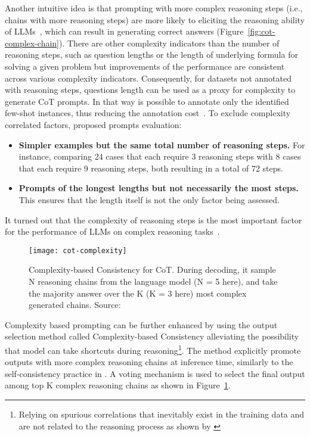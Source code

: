 Another intuitive idea is that prompting with more complex reasoning steps (i.e., chains with more reasoning steps) are more likely to eliciting the reasoning ability of LLMs~\cite{fu2022complexity}, which can result in generating correct answers (Figure~\ref{fig:cot-complex-chain}).
There are other complexity indicators than the number of reasoning steps, such as question lengths or the length of underlying formula for solving a given problem but improvements of the performance are consistent across various complexity indicators.
Consequently, for datasets not annotated with reasoning steps, questions length can be used as a proxy for complexity to generate CoT prompts.
In that way is possible to annotate only the identified few-shot instances, thus reducing the annotation cost~\cite{fu2022complexity}.
To exclude complexity correlated factors, \textcite{fu2022complexity} proposed prompts evaluation:
\begin{itemize}
	\item \textbf{Simpler examples but the same total number of reasoning steps.} {For instance, comparing 24 cases that each require 3 reasoning steps with 8 cases that each require 9 reasoning steps, both resulting in a total of 72 steps.}
	\item \textbf{Prompts of the longest lengths but not necessarily the most steps.} {This ensures that the length itself is not the only factor being assessed.}
\end{itemize}
It turned out that the complexity of reasoning steps is the most important factor for the performance of LLMs on complex reasoning tasks~\cite{fu2022complexity}.
\begin{figure}[h!]
	\centering
	\texttt{[image: cot-complexity]}
	\caption{Complexity-based Consistency for CoT. During decoding, it sample N reasoning chains from the language model (N = 5 here), and take the majority answer over the K (K = 3 here) most complex generated chains. Source: \textcite{fu2022complexity}}
	\label{fig:complexity}
\end{figure}
Complexity based prompting can be further enhanced by using the output selection method called Complexity-based Consistency alleviating the possibility that model can take shortcuts during reasoning\footnote{Relying on spurious correlations that inevitably exist in the training data and are not related to the reasoning process as shown by \textcite{mudrakarta2018model, li2021why, sugawara2018makes}}.
The method explicitly promote outputs with more complex reasoning chains at inference time, similarly to the self-consistency practice in \textcite{wang2022self}.
A voting mechanism is used to select the final output among top K complex reasoning chains as shown in Figure~\ref{fig:complexity}.

